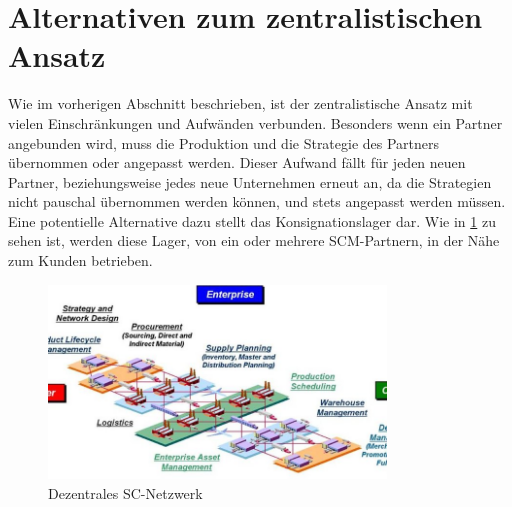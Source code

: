 \section{Alternativen zum zentralistischen Ansatz}
Wie im vorherigen Abschnitt beschrieben, ist der zentralistische Ansatz mit vielen Einschränkungen und Aufwänden verbunden. Besonders wenn  ein Partner angebunden wird, muss die Produktion und die Strategie des Partners übernommen oder angepasst werden. Dieser Aufwand fällt für jeden neuen Partner, beziehungsweise jedes neue Unternehmen erneut an, da die Strategien nicht pauschal übernommen werden können, und stets angepasst werden müssen.
Eine potentielle Alternative dazu stellt das Konsignationslager \cite[vgl. mit]{wiki:konsig_17_11} dar. Wie in \ref{fig:desc_netzwerk} zu sehen ist, werden diese Lager, von ein oder mehrere \ac{SCM}-Partnern, in der Nähe zum Kunden betrieben.

\begin{figure}[htbp]
	\centering
	\includegraphics[width=0.8\textwidth]{../pics/scm_komponent}
	\caption{Dezentrales SC-Netzwerk \cite{scm:grafik_decentr_lager_13}}
	\label{fig:desc_netzwerk}
\end{figure}

